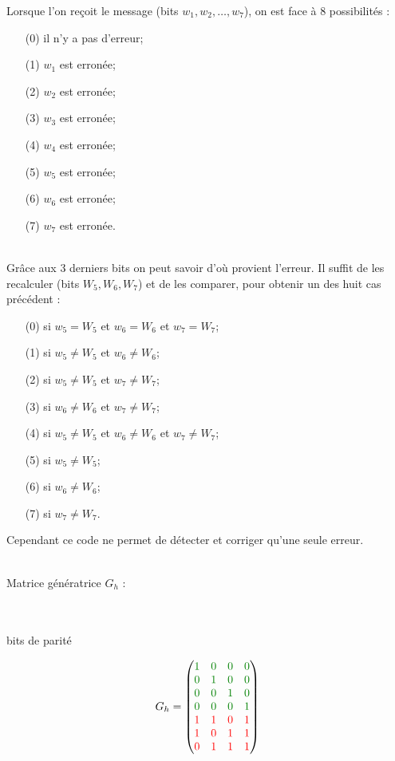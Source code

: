 Lorsque l'on reçoit le message (bits $w_1, w_2, \ldots, w_7$), on est face à 8 possibilités :

\begin{enumerate}
  \item[(0)] il n'y a pas d'erreur;
  \item[(1)] $w_1$ est erronée;
  \item[(2)] $w_2$ est erronée;
  \item[(3)] $w_3$ est erronée;
  \item[(4)] $w_4$ est erronée;
  \item[(5)] $w_5$ est erronée;
  \item[(6)] $w_6$ est erronée;
  \item[(7)] $w_7$ est erronée.
\end{enumerate}

\\ Grâce aux 3 derniers bits on peut savoir d'où provient l'erreur. Il suffit de les recalculer (bits $W_5, W_6, W_7$) et de les comparer, pour obtenir un des huit cas précédent :

\begin{enumerate}
  \item[(0)] si $w_5 = W_5$ et $w_6 = W_6$ et $w_7 = W_7$;
  \item[(1)] si $w_5 \ne W_5$ et $w_6 \ne W_6$;
  \item[(2)] si $w_5 \ne W_5$ et $w_7 \ne W_7$;
  \item[(3)] si $w_6 \ne W_6$ et $w_7 \ne W_7$;
  \item[(4)] si $w_5 \ne W_5$ et $w_6 \ne W_6$ et $w_7 \ne W_7$;
  \item[(5)] si $w_5 \ne W_5$;
  \item[(6)] si $w_6 \ne W_6$;
  \item[(7)] si $w_7 \ne W_7$.
\end{enumerate}

Cependant ce code ne permet de détecter et corriger qu'une seule erreur.

\\ Matrice génératrice $G_h$ :

\\ 
\\ bits de parité 

\begin{align*}
  G_h =
  \begin{pmatrix}
    \grn{1} & \grn{0} & \grn{0} & \grn{0} \\
    \grn{0} & \grn{1} & \grn{0} & \grn{0} \\
    \grn{0} & \grn{0} & \grn{1} & \grn{0} \\
    \grn{0} & \grn{0} & \grn{0} & \grn{1} \\
    \red{1} & \red{1} & \red{0} & \red{1} \\
    \red{1} & \red{0} & \red{1} & \red{1} \\
    \red{0} & \red{1} & \red{1} & \red{1}
  \end{pmatrix}
\end{align*}

